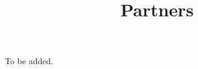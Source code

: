 \documentclass{ximera}
\title{Partners}
\begin{document}
\begin{abstract}
\end{abstract}
\maketitle

To be added.
\end{document}
